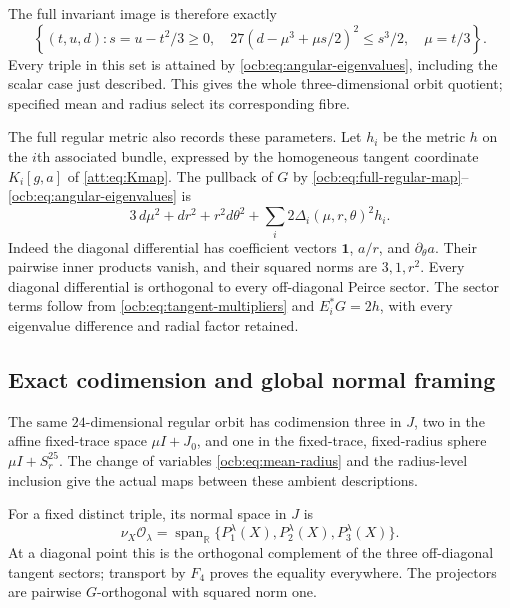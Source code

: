 \documentclass[11pt]{article}
\theoremstyle{definition}
\begin{document}
The full invariant image is therefore exactly
\begin{equation}
 \left\{(t,u,d):s=u-t^2/3\ge0,\quad
 27(d-\mu^3+\mu s/2)^2\le s^3/2,\quad\mu=t/3\right\}.
 \label{ocb:eq:invariant-image}\tag{OCB18}
\end{equation}
Every triple in this set is attained by
\eqref{ocb:eq:angular-eigenvalues}, including the scalar case just
described. This gives the whole three-dimensional orbit quotient;
specified mean and radius select its corresponding fibre.

The full regular metric also records these parameters. Let $h_i$ be
the metric $h$ on the $i$th associated bundle, expressed by the
homogeneous tangent coordinate $K_i[g,a]$ of \eqref{att:eq:Kmap}.
The pullback of $G$ by
\eqref{ocb:eq:full-regular-map}--\eqref{ocb:eq:angular-eigenvalues} is
\begin{equation}
 3\,d\mu^2+dr^2+r^2d\theta^2
             +\sum_i2\Delta_i(\mu,r,\theta)^2h_i.
 \label{ocb:eq:full-metric}\tag{OCB19}
\end{equation}
Indeed the diagonal differential has coefficient vectors
$\mathbf1$, $a/r$, and $\partial_\theta a$. Their pairwise inner
products vanish, and their squared norms are $3,1,r^2$. Every
diagonal differential is orthogonal to every off-diagonal Peirce
sector. The sector terms follow from
\eqref{ocb:eq:tangent-multipliers} and $E_i^*G=2h$, with every
eigenvalue difference and radial factor retained.

\subsection{Exact codimension and global normal framing}
\label{ocb:sec:normal-framing}

The same $24$-dimensional regular orbit has codimension three in $J$,
two in the affine fixed-trace space $\mu I+J_0$, and one in the
fixed-trace, fixed-radius sphere $\mu I+S_r^{25}$. The change of
variables \eqref{ocb:eq:mean-radius} and the radius-level inclusion
give the actual maps between these ambient descriptions.

For a fixed distinct triple, its normal space in $J$ is
\begin{equation}
 \nu_X\mathcal O_\lambda
 =\operatorname{span}_{\mathbb R}
     \{P_1^\lambda(X),P_2^\lambda(X),P_3^\lambda(X)\}.
 \label{ocb:eq:projector-normal-space}\tag{OCB20}
\end{equation}
At a diagonal point this is the orthogonal complement of the three
off-diagonal tangent sectors; transport by $F_4$ proves the equality
everywhere. The projectors are pairwise $G$-orthogonal with squared
norm one.
\end{document}
